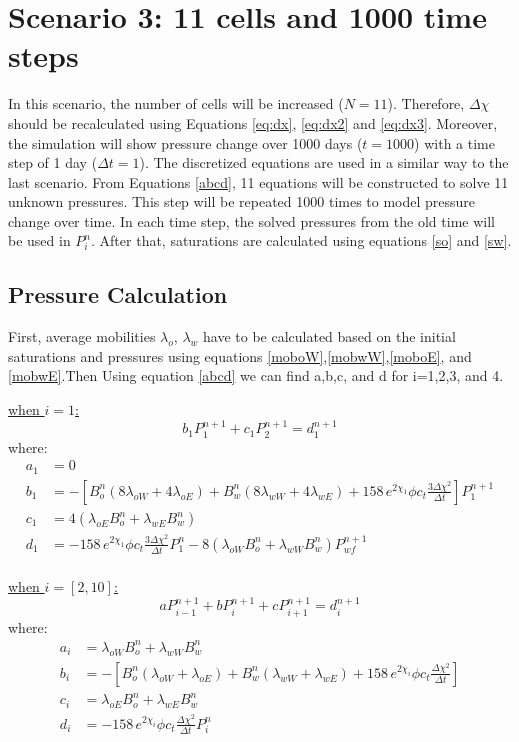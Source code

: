 \documentclass[12pt,letterpaper,titlepage]{article}
\begin{document}
\section{Scenario 3: 11 cells and 1000 time steps}
In this scenario, the number of cells will be increased ($N=11$). Therefore, $\Delta\chi$ should be recalculated using Equations \ref{eq:dx}, \ref{eq:dx2} and \ref{eq:dx3}. Moreover, the simulation will show pressure change over 1000 days ($t=1000$) with a time step of 1 day ($\Delta t=1$). The discretized equations are used in a similar way to the last scenario. From Equations \ref{abcd}, 11 equations will be constructed to solve 11 unknown pressures. This step will be repeated 1000 times to model pressure change over time. In each time step, the solved pressures from the old time will be used in $P_i^n$. After that, saturations are calculated using equations \ref{so} and \ref{sw}.
\subsection{Pressure Calculation}

First, average mobilities $\lambda_o$, $\lambda_w$ have to be calculated based on the initial saturations and pressures using equations \ref{moboW},\ref{mobwW},\ref{moboE}, and \ref{mobwE}.Then Using equation \ref{abcd} we can find a,b,c, and d for i=1,2,3, and 4.

\underline{when $i=1$:}\\
\begin{equation*}
b_1 P^{n+1}_{1}+c_1 P^{n+1}_{2} =d^{n+1}_1
\end{equation*}
where:
\begin{align*}
a_1&=0\\
b_1&=-\left[B_o^n(8\lambda_{oW}+4\lambda_{oE})+B_w^n(8\lambda_{wW}+4\lambda_{wE})+158\,e^{2\chi_1}\phi c_t \frac{3\Delta\chi^2}{\Delta t}\right]P_1^{n+1}\\
c_1&=4(\lambda_{oE}B_o^n+\lambda_{wE}B_w^n)\\
d_1&=-158\,e^{2\chi_1}\phi c_t \frac{3\Delta\chi^2}{\Delta t}P_1^n-8(\lambda_{oW}B_o^n+\lambda_{wW}B_w^n)P_{wf}^{n+1}\\
\end{align*}

\underline{when $i=[2,10]$:}
\begin{equation*}
a P^{n+1}_{i-1}+b P^{n+1}_{i}+c P^{n+1}_{i+1} =d^{n+1}_i
\end{equation*}
where:
\begin{align*}
a_i &=\lambda_{oW}B_o^n+\lambda_{wW}B_w^n\\
b_i &=-\left[B_o^n(\lambda_{oW}+\lambda_{oE})+B_w^n(\lambda_{wW}+\lambda_{wE})+158\,e^{2\chi_i}\phi c_t \frac{\Delta\chi^2}{\Delta t}\right]\\
c_i &=\lambda_{oE}B_o^n+\lambda_{wE}B_w^n\\
d_i &=-158\,e^{2\chi_i}\phi c_t \frac{\Delta\chi^2}{\Delta t}P_i^n\\
\end{align*}
\end{document}
